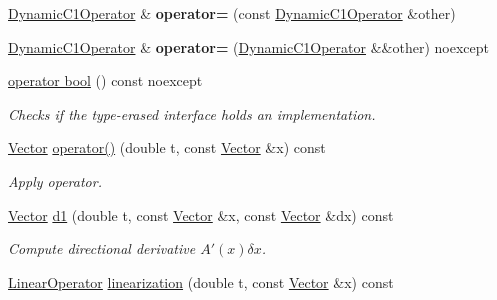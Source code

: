 \begin{DoxyCompactItemize}
\item 
\hyperlink{classSpacy_1_1DynamicC1Operator}{Dynamic\+C1\+Operator} \& {\bfseries operator=} (const \hyperlink{classSpacy_1_1DynamicC1Operator}{Dynamic\+C1\+Operator} \&other)\hypertarget{classSpacy_1_1DynamicC1Operator_a50675c96427f1b690300310e1416eae7}{}\label{classSpacy_1_1DynamicC1Operator_a50675c96427f1b690300310e1416eae7}

\item 
\hyperlink{classSpacy_1_1DynamicC1Operator}{Dynamic\+C1\+Operator} \& {\bfseries operator=} (\hyperlink{classSpacy_1_1DynamicC1Operator}{Dynamic\+C1\+Operator} \&\&other) noexcept\hypertarget{classSpacy_1_1DynamicC1Operator_a032fa2057de1dbff43936ec71a56bc20}{}\label{classSpacy_1_1DynamicC1Operator_a032fa2057de1dbff43936ec71a56bc20}

\item 
\hyperlink{classSpacy_1_1DynamicC1Operator_a96e8e4291ea083b224d5e8efdab87ed7}{operator bool} () const noexcept
\begin{DoxyCompactList}\small\item\em Checks if the type-\/erased interface holds an implementation. \end{DoxyCompactList}\item 
\hyperlink{classSpacy_1_1Vector}{Vector} \hyperlink{classSpacy_1_1DynamicC1Operator_a0859e4c204d9599769c42ca4147f1875}{operator()} (double t, const \hyperlink{classSpacy_1_1Vector}{Vector} \&x) const \hypertarget{classSpacy_1_1DynamicC1Operator_a0859e4c204d9599769c42ca4147f1875}{}\label{classSpacy_1_1DynamicC1Operator_a0859e4c204d9599769c42ca4147f1875}

\begin{DoxyCompactList}\small\item\em Apply operator. \end{DoxyCompactList}\item 
\hyperlink{classSpacy_1_1Vector}{Vector} \hyperlink{classSpacy_1_1DynamicC1Operator_acac514b4a574321a0bf923f9b348e106}{d1} (double t, const \hyperlink{classSpacy_1_1Vector}{Vector} \&x, const \hyperlink{classSpacy_1_1Vector}{Vector} \&dx) const \hypertarget{classSpacy_1_1DynamicC1Operator_acac514b4a574321a0bf923f9b348e106}{}\label{classSpacy_1_1DynamicC1Operator_acac514b4a574321a0bf923f9b348e106}

\begin{DoxyCompactList}\small\item\em Compute directional derivative $A'(x)\delta x$. \end{DoxyCompactList}\item 
\hyperlink{classSpacy_1_1LinearOperator}{Linear\+Operator} \hyperlink{classSpacy_1_1DynamicC1Operator_a3beba5b0012422e11b9c989efe0e224b}{linearization} (double t, const \hyperlink{classSpacy_1_1Vector}{Vector} \&x) const \hypertarget{classSpacy_1_1DynamicC1Operator_a3beba5b0012422e11b9c989efe0e224b}{}\label{classSpacy_1_1DynamicC1Operator_a3beba5b0012422e11b9c989efe0e224b}


\end{DoxyCompactItemize}
